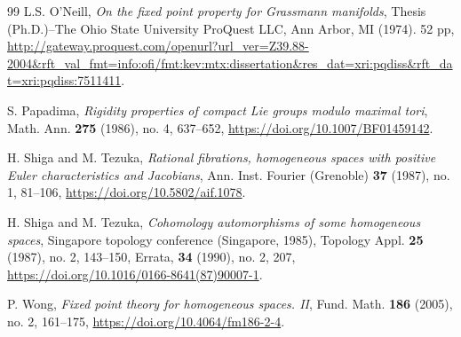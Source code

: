 \documentclass{amsart}
\begin{document}
\begin{thebibliography}{99}
 L.S. O'Neill, \textit{On the fixed point property for Grassmann manifolds}, Thesis (Ph.D.)--The Ohio %
State University ProQuest LLC, Ann Arbor, MI (1974). 52 pp, \url{http://gateway.proquest.com/openurl?url_ver=Z39.88-2004&rft_val_fmt=info:ofi/fmt:kev:mtx:dissertation&res_dat=xri:pqdiss&rft_dat=xri:pqdiss:7511411}.
  
 S. Papadima, \textit{Rigidity properties of compact Lie groups modulo maximal tori}, Math. Ann. \textbf{275} (1986), no. 4, 637--652, \url{https://doi.org/10.1007/BF01459142}.
	
 H. Shiga and M. Tezuka, \textit{Rational fibrations, homogeneous spaces with positive Euler characteristics and Jacobians}, Ann. Inst. Fourier (Grenoble) \textbf{37} (1987), no. 1, 81--106, \url{https://doi.org/10.5802/aif.1078}.
	
 H. Shiga and M. Tezuka, \textit{Cohomology automorphisms of some homogeneous spaces}, Singapore topology conference (Singapore, 1985), Topology Appl. \textbf{25} (1987), no. 2, 143--150, Errata, \textbf{34} (1990), no. 2, 207, \url{https://doi.org/10.1016/0166-8641(87)90007-1}.

 P. Wong, \textit{Fixed point theory for homogeneous spaces. II}, Fund. Math. \textbf{186} (2005), no. 2, 161--175, \url{https://doi.org/10.4064/fm186-2-4}.
\end{thebibliography}
\end{document}
